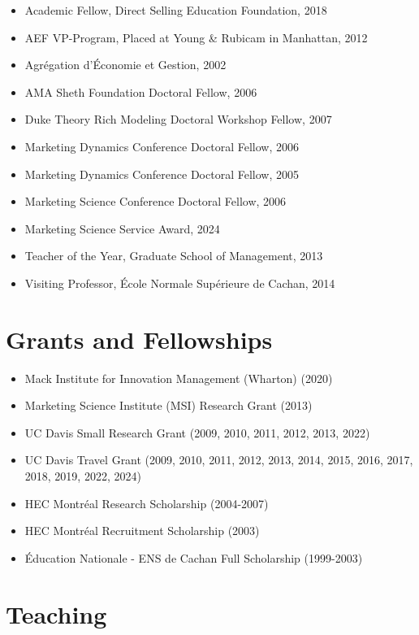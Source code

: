 \documentclass[10pt]{article}
\begin{document}
\begin{itemize}

\item[] Academic Fellow, Direct Selling Education Foundation, 2018
\item[] AEF VP-Program, Placed at Young \& Rubicam in Manhattan, 2012
\item[] Agr\'{e}gation d'\'{E}conomie et Gestion,  2002
\item[] AMA Sheth Foundation Doctoral Fellow, 2006
\item[] Duke Theory Rich Modeling Doctoral Workshop Fellow, 2007
\item[] Marketing Dynamics Conference Doctoral Fellow, 2006
\item[] Marketing Dynamics Conference Doctoral Fellow, 2005
\item[] Marketing Science Conference Doctoral Fellow, 2006
\item[] Marketing Science Service Award, 2024
\item[] Teacher of the Year, Graduate School of Management, 2013
\item[] Visiting Professor, \'{E}cole Normale Sup\'{e}rieure de Cachan, 2014
\end{itemize}

\section{Grants and Fellowships}

\begin{itemize}
\item[] Mack Institute for Innovation Management (Wharton) (2020)
\item[] Marketing Science Institute (MSI) Research Grant (2013)
\item[] UC Davis Small Research Grant (2009, 2010, 2011, 2012, 2013, 2022)
\item[] UC Davis Travel Grant (2009, 2010, 2011, 2012, 2013, 2014, 2015, 2016, 2017, 2018, 2019, 2022, 2024)
\item[] HEC Montr\'{e}al Research Scholarship (2004-2007)
\item[] HEC Montr\'{e}al Recruitment Scholarship (2003)
\item[] \'{E}ducation Nationale - ENS de Cachan Full Scholarship (1999-2003)
\end{itemize}

\section{Teaching}
\end{document}

